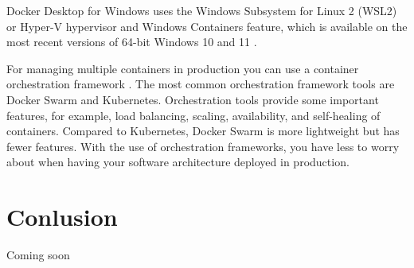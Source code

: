 \documentclass[fleqn,12pt]{olplainarticle}
\begin{document}
Docker Desktop for Windows uses the Windows Subsystem for Linux 2 (WSL2) or Hyper-V hypervisor and Windows Containers feature, which is available on the most recent versions of 64-bit Windows 10 and 11 \citep{docker:windows}.

For managing multiple containers in production you can use a container orchestration framework \citep{circleci:swarm_kubernetes}. The most common orchestration framework tools are Docker Swarm and Kubernetes. Orchestration tools provide some important features, for example, load balancing, scaling, availability, and self-healing of containers. Compared to Kubernetes, Docker Swarm is more lightweight but has fewer features. With the use of orchestration frameworks, you have less to worry about when having your software architecture deployed in production.

\section{Conlusion}
Coming soon

\end{document}
